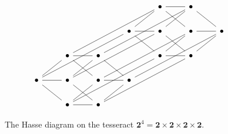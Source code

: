 \begin{figure}[h]
  \centering
  \[\begin{tikzcd}
    &&&& \bullet & \bullet \\
    &&& \bullet & \bullet & \bullet & \bullet \\
    & \bullet & \bullet && \bullet & \bullet \\
    \bullet & \bullet & \bullet & \bullet \\
    & \bullet & \bullet
    \arrow[no head, from=1-5, to=1-6]
    \arrow[no head, from=1-5, to=2-6]
    \arrow[no head, from=1-5, to=3-2]
    \arrow[no head, from=1-6, to=2-7]
    \arrow[no head, from=1-6, to=3-3]
    \arrow[no head, from=2-4, to=1-5]
    \arrow[no head, from=2-4, to=2-5]
    \arrow[no head, from=2-4, to=4-1]
    \arrow[no head, from=2-5, to=1-6]
    \arrow[no head, from=2-5, to=4-2]
    \arrow[no head, from=2-6, to=2-7]
    \arrow[no head, from=2-6, to=3-5]
    \arrow[no head, from=2-6, to=4-3]
    \arrow[no head, from=2-7, to=3-6]
    \arrow[no head, from=2-7, to=4-4]
    \arrow[no head, from=3-2, to=4-3]
    \arrow[no head, from=3-3, to=3-2]
    \arrow[no head, from=3-3, to=4-4]
    \arrow[no head, from=3-5, to=2-4]
    \arrow[no head, from=3-5, to=3-6]
    \arrow[no head, from=3-5, to=5-2]
    \arrow[no head, from=3-6, to=2-5]
    \arrow[no head, from=3-6, to=5-3]
    \arrow[no head, from=4-1, to=3-2]
    \arrow[no head, from=4-2, to=3-3]
    \arrow[no head, from=4-2, to=4-1]
    \arrow[no head, from=4-3, to=5-2]
    \arrow[no head, from=4-4, to=4-3]
    \arrow[no head, from=4-4, to=5-3]
    \arrow[no head, from=5-2, to=4-1]
    \arrow[no head, from=5-3, to=4-2]
    \arrow[no head, from=5-3, to=5-2]
  \end{tikzcd}\]
  \caption{The Hasse diagram on the tesseract $\textbf{2}^4 =
  \textbf{2} \times \textbf{2} \times \textbf{2} \times \textbf{2}$.}
  \label{figure_1.5}
\end{figure}

